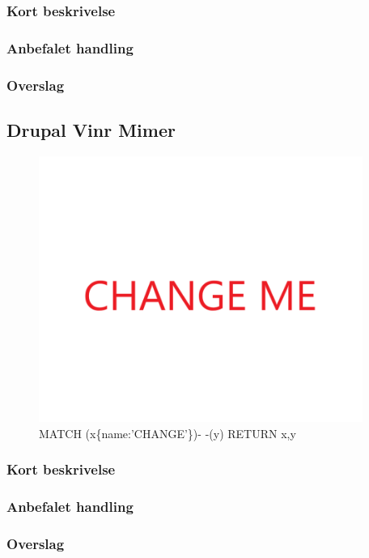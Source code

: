 \documentclass{article}
\begin{document}
\subsubsection{Kort beskrivelse}
\subsubsection{Anbefalet handling}
\subsubsection{Overslag}
\subsection{Drupal Vinr Mimer}
\begin{figure}[h]
\includegraphics[width=300pt]{CHANGE.PNG}
\caption{MATCH (x\{name:'CHANGE'\})- -(y) RETURN x,y}
\end{figure}
\subsubsection{Kort beskrivelse}
\subsubsection{Anbefalet handling}
\subsubsection{Overslag}
\end{document}

